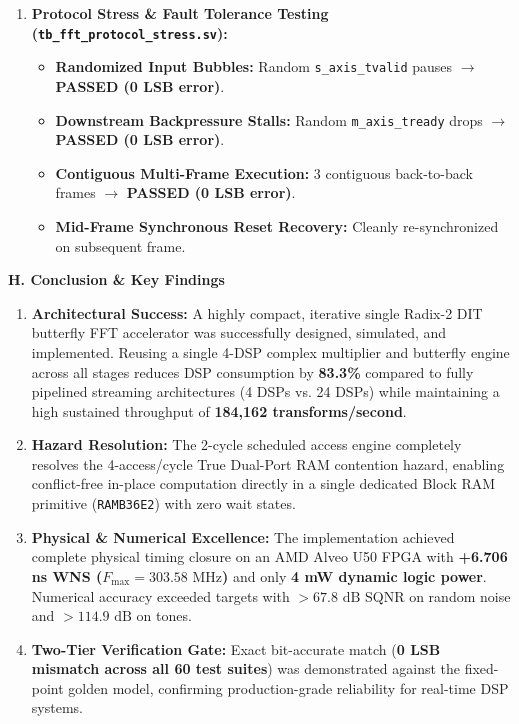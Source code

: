 \documentclass[10pt,a4paper]{article}
\newcommand{\reportsection}[1]{%
  \vspace{3mm}%
  \noindent
  \begin{tcolorbox}[
    colback=tableheaderbg,
    colframe=bordergray,
    arc=1.2mm,
    boxrule=0.8pt,
    left=4mm, right=4mm, top=2.2mm, bottom=2.2mm
  ]
    {\Large\bfseries\color{headerblue}#1}
  \end{tcolorbox}%
  \vspace{1mm}%
}
\begin{document}
\begin{enumerate}[label=\bfseries\arabic*., leftmargin=6mm, itemsep=3pt]
\begin{table}[H]
    \end{table}
    \item \textbf{Protocol Stress \& Fault Tolerance Testing (\texttt{tb\_fft\_protocol\_stress.sv}):}
    \begin{itemize}
        \item \textbf{Randomized Input Bubbles:} Random \texttt{s\_axis\_tvalid} pauses $\rightarrow$ \textbf{PASSED (0 LSB error)}.
        \item \textbf{Downstream Backpressure Stalls:} Random \texttt{m\_axis\_tready} drops $\rightarrow$ \textbf{PASSED (0 LSB error)}.
        \item \textbf{Contiguous Multi-Frame Execution:} 3 contiguous back-to-back frames $\rightarrow$ \textbf{PASSED (0 LSB error)}.
        \item \textbf{Mid-Frame Synchronous Reset Recovery:} Cleanly re-synchronized on subsequent frame.
    \end{itemize}
\end{enumerate}

\reportsection{H. Conclusion \& Key Findings}

\begin{enumerate}[label=\bfseries\arabic*., leftmargin=6mm, itemsep=3pt]
    \item \textbf{Architectural Success:} A highly compact, iterative single Radix-2 DIT butterfly FFT accelerator was successfully designed, simulated, and implemented. Reusing a single 4-DSP complex multiplier and butterfly engine across all stages reduces DSP consumption by \textbf{83.3\%} compared to fully pipelined streaming architectures (4 DSPs vs. 24 DSPs) while maintaining a high sustained throughput of \textbf{184,162 transforms/second}.
    \item \textbf{Hazard Resolution:} The 2-cycle scheduled access engine completely resolves the 4-access/cycle True Dual-Port RAM contention hazard, enabling conflict-free in-place computation directly in a single dedicated Block RAM primitive (\texttt{RAMB36E2}) with zero wait states.
    \item \textbf{Physical \& Numerical Excellence:} The implementation achieved complete physical timing closure on an AMD Alveo U50 FPGA with \textbf{+6.706 ns WNS ($F_{\max} = 303.58\text{ MHz}$)} and only \textbf{4 mW dynamic logic power}. Numerical accuracy exceeded targets with $> 67.8\text{ dB}$ SQNR on random noise and $> 114.9\text{ dB}$ on tones.
    \item \textbf{Two-Tier Verification Gate:} Exact bit-accurate match (\textbf{0 LSB mismatch across all 60 test suites}) was demonstrated against the fixed-point golden model, confirming production-grade reliability for real-time DSP systems.
\end{enumerate}
\end{document}
